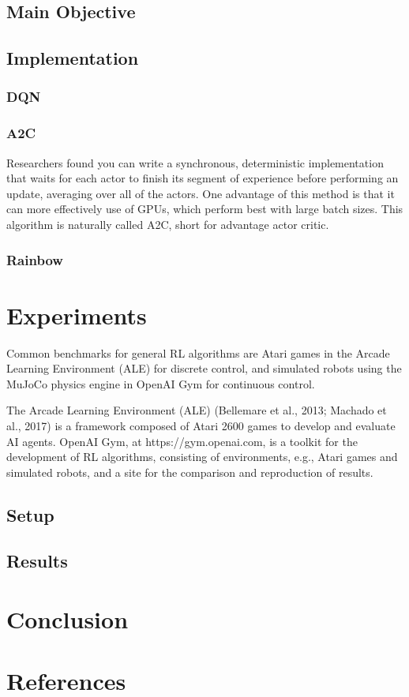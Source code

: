 \documentclass[11 pt, twocolumn]{article}
\begin{document}
\subsection{Main Objective}

\subsection{Implementation}


\subsubsection{DQN}

\subsubsection{A2C}
Researchers found you can write a synchronous, deterministic implementation that waits for each actor to finish its segment of experience before performing an update, averaging over all of the actors. One advantage of this method is that it can more effectively use of GPUs, which perform best with large batch sizes. This algorithm is naturally called A2C, short for advantage actor critic.

\subsubsection{Rainbow}


\section{Experiments}
Common benchmarks for general RL algorithms are Atari games in the Arcade Learning Environment (ALE) for discrete control, and simulated robots using the MuJoCo physics engine in OpenAI
Gym for continuous control.

The Arcade Learning Environment (ALE) (Bellemare et al., 2013; Machado et al., 2017) is a framework composed of Atari 2600 games to develop and evaluate AI agents. OpenAI Gym, at https://gym.openai.com, is a toolkit for the development of RL algorithms, consisting of environments, e.g., Atari games and simulated robots, and a site for the comparison and reproduction of results.

\subsection{Setup}

\subsection{Results}

\section{Conclusion}

\section{References}
\end{document}
